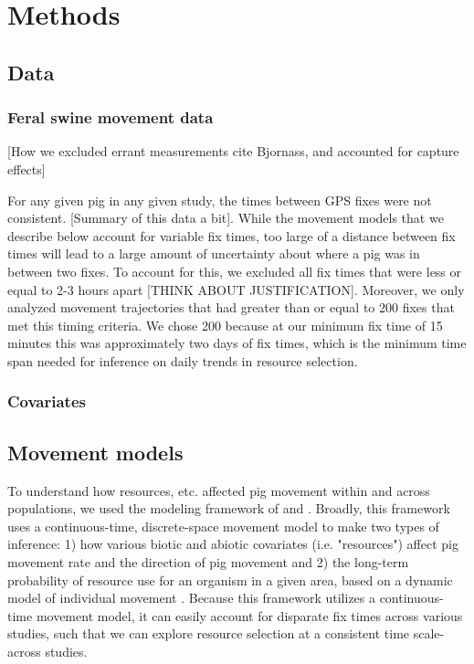 \documentclass[a4paper]{article}
\begin{document}
\section*{Methods}

\subsection*{Data}

\subsubsection*{Feral swine movement data}

[How we excluded errant measurements cite Bjornass, and accounted for capture 
effects]

For any given pig in any given study, the times between GPS fixes were not consistent.  [Summary of this data a bit].  While the movement models that we describe below account for variable fix times, too large of a distance between fix times will lead to a large amount of uncertainty about where a pig was in between two fixes. To account for this, we excluded all fix times that were less or equal to 2-3 hours apart [THINK ABOUT JUSTIFICATION]. Moreover, we only analyzed movement trajectories that had greater than or equal to 200 fixes that met this timing criteria. We chose 200 because at our minimum fix time of 15 minutes this was approximately two days of fix times, which is the minimum time span needed for inference on daily trends in resource selection. 

\subsubsection*{Covariates}

\subsection*{Movement models}

To understand how resources, etc. affected pig movement within and across populations, we used the modeling framework of \cite{Hanks2015} and \cite{Wilson2018}. Broadly, this framework uses a continuous-time, discrete-space movement model to make two types of inference: 1) how various biotic and abiotic covariates (i.e. "resources") affect pig movement rate and the direction of pig movement \citep{Hanks2015} and 2) the long-term probability of resource use for an organism in a given area, based on a dynamic model of individual movement \citep{Wilson2018}.  Because this framework utilizes a continuous-time movement model, it can easily account for disparate fix times across various studies, such that we can explore resource selection at a consistent time scale-across studies.
\end{document}
